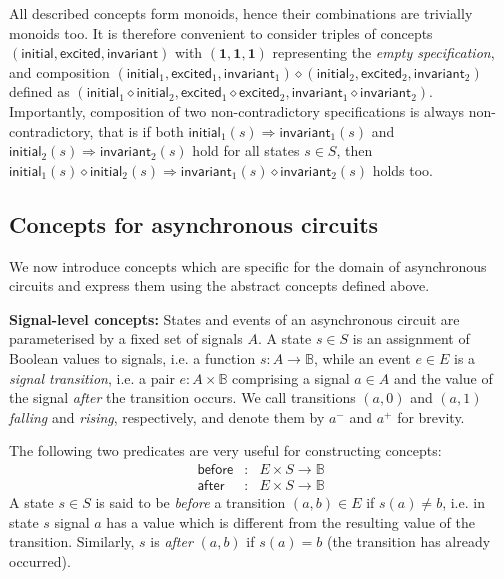\documentclass[british,compsoc]{IEEEtran}
\begin{document}
All described concepts form monoids, hence their combinations are
trivially monoids too. It is therefore convenient to consider triples
of concepts $(\mathsf{initial},\mathsf{excited},\mathsf{invariant})$
with $(\mathbf{1},\mathbf{1},\mathbf{1})$ representing the \emph{empty
specification}, and composition $(\mathsf{initial}_{1},\mathsf{excited}_{1},\mathsf{invariant}_{1})\diamond(\mathsf{initial}_{2},\mathsf{excited}_{2},\mathsf{invariant}_{2})$
defined as $(\mathsf{initial}_{1}\diamond\mathsf{initial}_{2},\mathsf{excited}_{1}\diamond\mathsf{excited}_{2},\mathsf{invariant}_{1}\diamond\mathsf{invariant}_{2})$.
Importantly, composition of two non-contradictory specifications is
always non-contradictory, that is if both $\mathsf{initial}_{1}(s)\Rightarrow\mathsf{invariant}_{1}(s)$
and $\mathsf{initial}_{2}(s)\Rightarrow\mathsf{invariant}_{2}(s)$
hold for all states $s\in S$, then $\mathsf{initial}_{1}(s)\diamond\mathsf{initial}_{2}(s)\Rightarrow\mathsf{invariant}_{1}(s)\diamond\mathsf{invariant}_{2}(s)$
holds too.




\subsection{Concepts for asynchronous circuits\label{sub:Concepts-for-asynchronous}}



We now introduce concepts which are specific for the domain of asynchronous
circuits and express them using the abstract concepts defined above.

\textbf{\label{signal-level}Signal-level concepts:} States and events of an asynchronous
circuit are parameterised by a fixed set of signals $A$. A state
$s\in S$ is an assignment of Boolean values to signals, i.e. a function
$s:A\rightarrow\mathbb{B}$, while an event $e\in E$ is a \emph{signal
transition}, i.e. a pair $e:A\times\mathbb{B}$ comprising a signal
$a\in A$ and the value of the signal \emph{after} the transition
occurs. We call transitions $(a,0)$ and $(a,1)$ \emph{falling} and
\emph{rising}, respectively, and denote them by $a^{-}$ and $a^{+}$
for brevity.

The following two predicates are very useful for constructing concepts:
\[
\begin{array}{ccc}
\mathsf{before} & \!\!\!\!:\!\!\!\!\! & E\times S\rightarrow\mathbb{B}\\
\mathsf{after} & \!\!\!\!:\!\!\!\!\! & E\times S\rightarrow\mathbb{B}
\end{array}
\]
A state $s\in S$ is said to be \emph{before} a transition $(a,b)\in E$
if $s(a)\neq b$, i.e. in state $s$ signal $a$ has a value which
is different from the resulting value of the transition. Similarly,
$s$ is \emph{after} $(a,b)$ if $s(a)=b$ (the transition has already
occurred).
\end{document}
